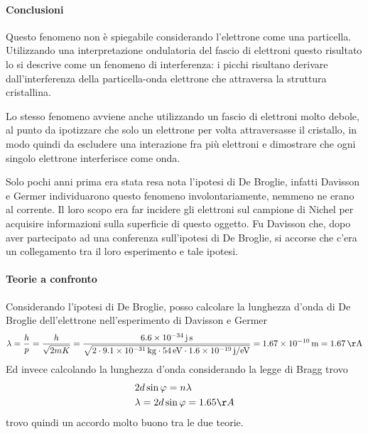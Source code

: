 \paragraph{Conclusioni}
Questo fenomeno non è spiegabile considerando l'elettrone come una particella.
Utilizzando una interpretazione ondulatoria del fascio di elettroni questo risultato lo si descrive come un fenomeno di interferenza:
i picchi risultano derivare dall'interferenza della particella-onda elettrone che attraversa la struttura cristallina.

Lo stesso fenomeno avviene anche utilizzando un fascio di elettroni molto debole, al punto da ipotizzare che solo un elettrone per volta attraversasse il cristallo, in modo quindi da escludere una interazione fra più elettroni e dimostrare che ogni singolo elettrone interferisce come onda.

Solo pochi anni prima era stata resa nota l'ipotesi di De Broglie, infatti Davisson e Germer individuarono questo fenomeno involontariamente, nemmeno ne erano al corrente.
Il loro scopo era far incidere gli elettroni sul campione di Nichel per acquisire informazioni sulla superficie di questo oggetto.
Fu Davisson che, dopo aver partecipato ad una conferenza sull'ipotesi di De Broglie, si accorse che c'era un collegamento tra il loro esperimento e tale ipotesi.

\paragraph{Teorie a confronto}
Considerando l'ipotesi di De Broglie, posso calcolare la lunghezza d'onda di De Broglie dell'elettrone nell'esperimento di Davisson e Germer
\begin{equation}
\lambda = \frac{ h}{p } = \frac{ h}{\sqrt{2mK} } 
= \frac{\SI{6.6e-34}{j.s} }{\sqrt{ 2 \cdot \SI{9.1e-31}{kg} \cdot \SI{54}{eV} \cdot \SI{1.6e-19}{j / eV} } } 
= \SI{1.67e-10}{m} = \SI{1.67}{\AA}
\end{equation}
Ed invece calcolando la lunghezza d'onda considerando la legge di Bragg trovo
\begin{equation}
\begin{split}
& 2 d \sin \varphi = n \lambda \\
& \lambda = 2 d \sin \varphi = 1.65 \AA
\end{split}
\end{equation}
trovo quindi un accordo molto buono tra le due teorie.





